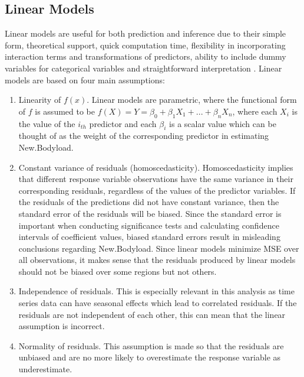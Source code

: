 \subsection{Linear Models}
 Linear models are useful for both prediction and inference due to their simple form, theoretical support, quick computation time, flexibility in incorporating interaction terms and transformations of predictors, ability to include dummy variables for categorical variables and straightforward interpretation \cite{ESL}. Linear models are based on four main assumptions: 
\begin{enumerate}
\item Linearity of ${f}(x)$. Linear models are parametric, where the functional form of $f$ is assumed to be $f(X)=Y=\beta_0+\beta_1X_1+...+\beta_nX_n$, where each $X_i$ is the value of the $i_{th}$ predictor and each $\beta_i$ is a scalar value which can be thought of as the weight of the corresponding predictor in estimating New.Bodyload.
\item Constant variance of residuals (homoscedasticity). Homoscedasticity implies that different response variable observations have the same variance in their corresponding residuals, regardless of the values of the predictor variables. If the residuals of the predictions did not have constant variance, then the standard error of the residuals will be biased. Since the standard error is important when conducting significance tests and calculating confidence intervals of coefficient values, biased standard errors result in misleading conclusions regarding New.Bodyload. Since linear models minimize MSE over all observations, it makes sense that the residuals produced by linear models should not be biased over some regions but not others.

\item Independence of residuals. This is especially relevant in this analysis as time series data can have seasonal effects which lead to correlated residuals. If the residuals are not independent of each other, this can mean that the linear assumption is incorrect.

\item Normality of residuals. This assumption is made so that the residuals are unbiased and are no more likely to overestimate the response variable as underestimate.
\end{enumerate}

